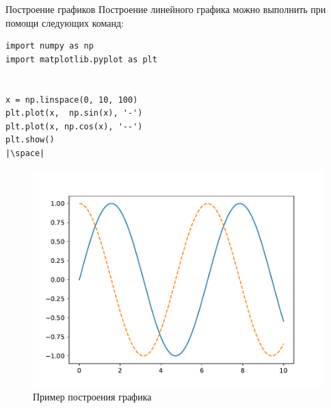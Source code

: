 \documentclass[aspectratio=169, mathserif]{beamer}	%
\begin{document}
\begin{frame}[fragile, label=m]{Построение графиков}
\scriptsize
Построение линейного графика можно выполнить при помощи следующих команд:
\vfill
\begin{minipage}{.4\textwidth}
\begin{verbatim}
import numpy as np
import matplotlib.pyplot as plt


x = np.linspace(0, 10, 100)
plt.plot(x,  np.sin(x), '-')
plt.plot(x, np.cos(x), '--')
plt.show()
|\space|
\end{verbatim}
\end{minipage}
\begin{minipage}{.59\textwidth}
\begin{figure}[h!]
	\centering
	\includegraphics[width=\linewidth]{./pics/Figure_1.pdf}
	\caption{Пример построения графика}
\end{figure}
\end{minipage}
\vfill
\end{frame}
\end{document}
